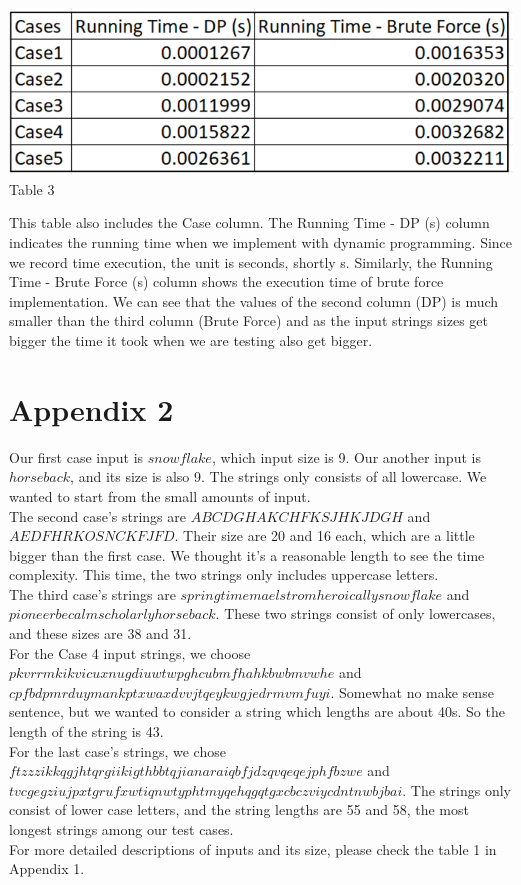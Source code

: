 \documentclass{article}
\begin{document}
\begin{center}
\includegraphics[scale = 0.5]{table3}\\
\scriptsize{Table 3}
\end{center}
This table also includes the Case column. The Running Time - DP (s) column indicates the running time when we implement with dynamic programming. Since we record time execution, the unit is seconds, shortly s. Similarly, the Running Time - Brute Force (s) column shows the execution time of brute force implementation. We can see that the values of the second column (DP) is much smaller than the third column (Brute Force) and as the input strings sizes get bigger the time it took when we are testing also get bigger. 

\section{\textbf{Appendix 2}}
\indent Our first case input is $snowflake$, which input size is 9. Our another input is $horseback$, and its size is also 9. The strings only consists of all lowercase. We wanted to start from the small amounts of input. \\ 
\indent The second case's strings are $ABCDGHAKCHFKSJHKJDGH$ and $AEDFHRKOSNCKFJFD$. Their size are 20 and 16 each, which are a little bigger than the first case. We thought it's a reasonable length to see the time complexity. This time, the two strings only includes uppercase letters. \\
\indent The third case's strings are $springtimemaelstromheroicallysnowflake$ and $pioneerbecalmscholarlyhorseback$. These two strings consist of only lowercases, and these sizes are 38 and 31. \\
\indent For the Case 4 input strings, we choose $pkvrrmkikvicuxnugdiuwtwpghcubmfhahkbwbmvwhe$ and $cpfbdpmrduymankptxwaxdvvjtqeykwgjedrmvmfuyi$. Somewhat no make sense sentence, but we wanted to consider a string which lengths are about 40s. So the length of the string is 43.\\
\indent For the last case's strings, we chose $ftzzzikkqgjhtqrgiikigthbbtqjianaraiqbfjdzqvqeqejphfbzwe$ and $tvcgegziujpxtgrufxwtiqnwtyphtmyqehqgqtgxcbczviycdntnwbjbai$. The strings only consist of lower case letters, and the string lengths are 55 and 58, the most longest strings among our test cases. \\
\indent For more detailed descriptions of inputs and its size, please check the table 1 in Appendix 1.
\end{document}

